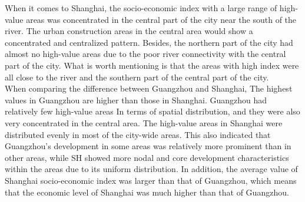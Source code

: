 When it comes to Shanghai, the socio-economic index with a large range of high-value areas was concentrated in the central part of the city near the south of the river. The urban construction areas in the central area would show a concentrated and centralized pattern. Besides, the northern part of the city had almost no high-value areas due to the poor river connectivity with the central part of the city. What is worth mentioning is that the areas with high index were all close to the river and the southern part of the central part of the city.\\

When comparing the difference between Guangzhou and Shanghai, The highest values in Guangzhou are higher than those in Shanghai. Guangzhou had relatively few high-value areas In terms of spatial distribution, and they were also very concentrated in the central area. The high-value areas in Shanghai were distributed evenly in most of the city-wide areas. This also indicated that Guangzhou's development in some areas was relatively more prominent than in other areas, while SH showed more nodal and core development characteristics within the areas due to its uniform distribution. In addition, the average value of Shanghai socio-economic index was larger than that of Guangzhou, which means that the economic level of Shanghai was much higher than that of Guangzhou.\\

